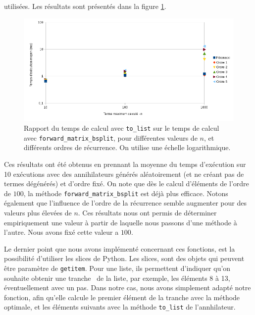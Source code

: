 \documentclass[12pt]{article}
\newlength{\charwidth}
\newcommand{\uline}{\underline{\hspace{2\charwidth}}}
\begin{document}
        utilisées. Les résultats sont présentés dans la figure \ref{fig:getitem}.
        \begin{figure} \begin{center}
            \includegraphics[scale=0.7]{figures/graphe.png}
            \caption{\label{fig:getitem}Rapport du temps de calcul avec \texttt{to\_list} sur le temps
            de calcul avec \texttt{forward\_matrix\_bsplit}, pour différentes valeurs de $n$, et différents
            ordres de récurrence. On utilise une échelle logarithmique.}
        \end{center} \end{figure}
        Ces résultats ont été obtenus en prennant la moyenne du temps d'exécution sur 10 exécutions avec
        des annihilateurs générés aléatoirement (et ne créant pas de termes dégénérés) et d'ordre fixé.
        On note que dès le 
        calcul d'éléments de l'ordre de $100$, la méthode \texttt{forward\_matrix\_bsplit} est déjà plus
        efficace. Notons également que l'influence de l'ordre de la récurrence semble augmenter pour 
        des valeurs plus élevées de $n$. 
        Ces résultats nous ont permis de déterminer empiriquement
        une valeur à partir de laquelle nous passons d'une méthode à l'autre. Nous avons fixé cette valeur
        a $100$.\\
        \par Le dernier point que nous avons implémenté concernant ces fonctions,
        est la possibilité d'utiliser les slices de Python. Les slices, sont des objets
        qui peuvent être paramètre de \texttt{\uline getitem\uline}. Pour une liste, ils permettent
        d'indiquer qu'on souhaite obtenir une \og tranche \fg\ de la liste, par exemple, les éléments
        8 à 13, éventuellement avec un pas. Dans notre cas, nous avons simplement adapté notre
        fonction, afin qu'elle calcule le premier élément de la tranche avec la méthode optimale,
        et les éléments suivants avec la méthode \texttt{to\_list} de l'annhilateur.
\end{document}
